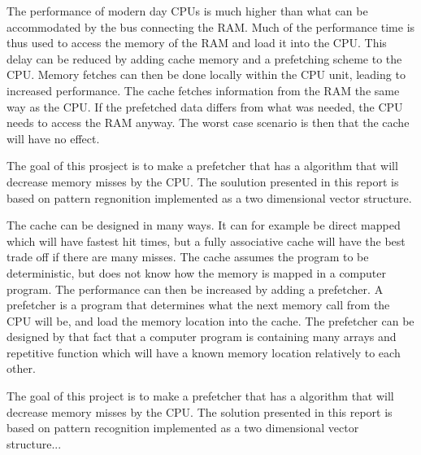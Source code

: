 The performance of modern day CPUs is much higher than what can be accommodated by the bus connecting the RAM. Much of the performance time is thus used to access the memory of the RAM and load it into the CPU. This delay can be reduced by adding cache memory and a prefetching scheme to the CPU. Memory fetches can then be done locally within the CPU unit, leading to increased performance. The cache fetches information from the RAM the same way as the CPU. If the prefetched data differs from what was needed, the CPU needs to access the RAM anyway. The worst case scenario is then that the cache will have no effect.


The goal of this prosject is to make a prefetcher that has a algorithm that will decrease memory misses by the CPU. The soulution presented in this report is based on pattern regnonition implemented as a two dimensional vector structure.

The cache can be designed in many ways. It can for example be direct mapped which will have fastest hit times, but a fully associative cache will have the best trade off if there are many misses. The cache assumes the program to be deterministic, but does not know how the memory is mapped in a computer program. The performance can then be increased by adding a prefetcher. A prefetcher is a program that determines what the next memory call from the CPU will be, and load the memory location into the cache. The prefetcher can be designed by that fact that a computer program is containing many arrays and repetitive function which will have a known memory location relatively to each other.

The goal of this project is to make a prefetcher that has a algorithm that will decrease memory misses by the CPU. The solution presented in this report is based on pattern recognition implemented as a two dimensional vector structure...


